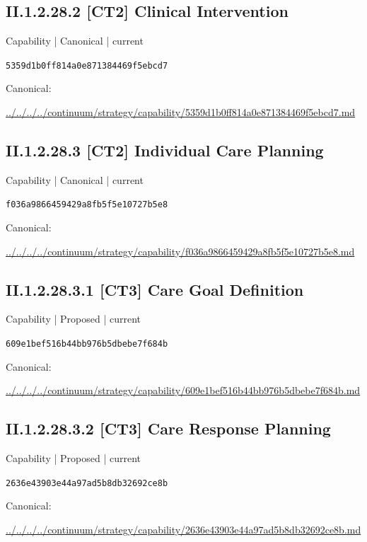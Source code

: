 \documentclass[10pt,a4paper]{article}
\begin{document}
\subsection*{II.1.2.28.2 [CT2] Clinical Intervention}
{\small Capability | Canonical | current}\par
\texttt{5359d1b0ff814a0e871384469f5ebcd7}\par
Canonical: \par
{\footnotesize\url{../../../../continuum/strategy/capability/5359d1b0ff814a0e871384469f5ebcd7.md}}\par
\subsection*{II.1.2.28.3 [CT2] Individual Care Planning}
{\small Capability | Canonical | current}\par
\texttt{f036a9866459429a8fb5f5e10727b5e8}\par
Canonical: \par
{\footnotesize\url{../../../../continuum/strategy/capability/f036a9866459429a8fb5f5e10727b5e8.md}}\par
\subsection*{II.1.2.28.3.1 [CT3] Care Goal Definition}
{\small Capability | Proposed | current}\par
\texttt{609e1bef516b44bb976b5dbebe7f684b}\par
Canonical: \par
{\footnotesize\url{../../../../continuum/strategy/capability/609e1bef516b44bb976b5dbebe7f684b.md}}\par
\subsection*{II.1.2.28.3.2 [CT3] Care Response Planning}
{\small Capability | Proposed | current}\par
\texttt{2636e43903e44a97ad5b8db32692ce8b}\par
Canonical: \par
{\footnotesize\url{../../../../continuum/strategy/capability/2636e43903e44a97ad5b8db32692ce8b.md}}\par
\end{document}
